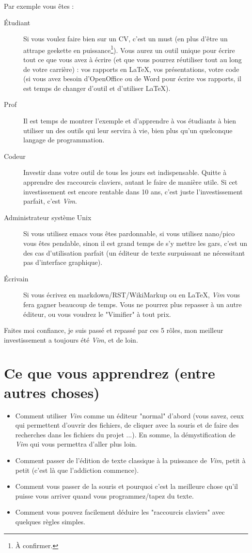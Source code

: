 Par exemple vous êtes :
\begin{description}
    \item[Étudiant] Si vous voulez faire bien sur un CV, c'est un must (en plus d'être un attrape geekette en puissance\footnote{À confirmer.}). Vous aurez un outil unique pour écrire tout ce que vous avez à écrire (et que vous pourrez réutiliser tout au long de votre carrière) : vos rapports en \LaTeX, vos présentations, votre code (si vous avez besoin d'OpenOffice ou de Word pour écrire vos rapports, il est temps de changer d'outil et d'utiliser \LaTeX).
    \item[Prof] Il est temps de montrer l'exemple et d'apprendre à vos étudiants à bien utiliser un des outils qui leur servira à vie, bien plus qu'un quelconque langage de programmation.
    \item[Codeur] Investir dans votre outil de tous les jours est indispensable. Quitte à apprendre des raccourcis claviers, autant le faire de manière utile. Si cet investissement est encore rentable dans 10 ans, c'est juste l'investissement parfait, c'est \emph{Vim}.
    \item[Administrateur système Unix] Si vous utilisez emacs vous êtes pardonnable, si vous utilisez nano/pico vous êtes pendable, sinon il est grand temps de s'y mettre les gars, c'est un des cas d'utilisation parfait (un éditeur de texte surpuissant ne nécessitant pas d'interface graphique).
    \item[Écrivain] Si vous écrivez en markdown/RST/WikiMarkup ou en \LaTeX, \emph{Vim} vous fera gagner beaucoup de temps. Vous ne pourrez plus repasser à un autre éditeur, ou vous voudrez le "Vimifier" à tout prix.
\end{description}

Faites moi confiance, je suis passé et repassé par ces 5 rôles, mon meilleur investissement a toujours été \emph{Vim}, et de loin.

\section{Ce que vous apprendrez (entre autres choses)}

\begin{itemize}
    \item Comment utiliser \emph{Vim} comme un éditeur "normal" d'abord (vous savez, ceux qui permettent d'ouvrir des fichiers, de cliquer avec la souris et de faire des recherches dans les fichiers du projet ...). En somme, la démystification de \emph{Vim} qui vous permettra d'aller plus loin.
    \item Comment passer de l'édition de texte classique à la puissance de \emph{Vim}, petit à petit (c'est là que l'addiction commence).
    \item Comment vous passer de la souris et pourquoi c'est la meilleure chose qu'il puisse vous arriver quand vous programmez/tapez du texte.
    \item Comment vous pouvez facilement déduire les "raccourcis claviers" avec quelques règles simples.
\end{itemize}

